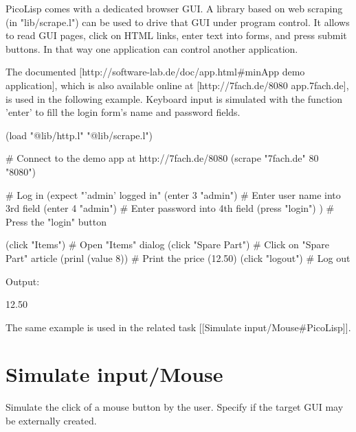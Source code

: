 \begin{wideverbatim}

PicoLisp comes with a dedicated browser GUI. A library based on web scraping (in
"lib/scrape.l") can be used to drive that GUI under program control. It allows
to read GUI pages, click on HTML links, enter text into forms, and press submit
buttons. In that way one application can control another application.

The documented [http://software-lab.de/doc/app.html#minApp demo application],
which is also available online at [http://7fach.de/8080 app.7fach.de], is used
in the following example. Keyboard input is simulated with the function 'enter'
to fill the login form's name and password fields.

(load "@lib/http.l" "@lib/scrape.l")

# Connect to the demo app at http://7fach.de/8080
(scrape "7fach.de" 80 "8080")

# Log in
(expect "'admin' logged in"
   (enter 3 "admin")       # Enter user name into 3rd field
   (enter 4 "admin")       # Enter password into 4th field
   (press "login") )       # Press the "login" button

(click "Items")         # Open "Items" dialog
(click "Spare Part")    # Click on "Spare Part" article
(prinl (value 8))       # Print the price (12.50)
(click "logout")        # Log out

Output:

12.50

The same example is used in the related task [[Simulate input/Mouse#PicoLisp]].

\end{wideverbatim}

\pagebreak{}
\section*{Simulate input/Mouse}

Simulate the click of a mouse button by the user. Specify if the target
GUI may be externally created.

